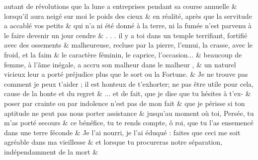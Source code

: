 \documentclass[12pt,onecolumn,twoside,a4paper]{memoir}
\begin{document}
\begin{pairs}
\begin{Rightside}
                       
                         \stanza 
                      autant de révolutions que la lune a entreprises pendant sa course
                              annuelle  \&
                         \stanza 
                      lorsqu’il aura neigé sur moi le poids des cieux \&
                         \stanza 
                      en réalité, après que la servitude a accablé vos petits  \&
                         \stanza 
                      qui n’a ni été donné à la terre, ni la fumée n’est parvenu à le faire
                              devenir un jour cendre \&
                         \stanza 
                      . . . il y a toi dans un temple terrifiant, fortifié avec des
                              ossements  \&
                         \stanza 
                      malheureuse, recluse par la pierre, l’ennui, la crasse, avec le
                              froid, et la faim \&
                         \stanza 
                      le caractère féminin, le caprice, l’occasion... \&
                         \stanza  beaucoup de femme, à l’âme inégale, a accru son malheur dans le
                              malheur , & 
                      un naturel vicieux leur a porté préjudice plus que le sort ou la
                              Fortune. \&
                         \stanza 
                      Je ne trouve pas comment je peux t’aider ; il est honteux de
                              t’exhorter; ne pas être utile 
                              pour cela, cause de la honte et du regret \&
                         \stanza  ... et de fait, que je dise que tu hésites à t’ex- & 
                     poser par crainte ou par indolence n’est pas de mon fait \&
                         \stanza 
                      que je périsse si ton aptitude ne peut pas nous porter assistance \&
                         \stanza 
                      jusqu’au moment où toi, Persée, tu m’as porté secours \&
                         \stanza 
                      ce bénéfice, tu te rends compte, ô roi, que tu l’as ensemencé dans
                              une terre féconde  \&
                         \stanza 
                      Je l’ai nourri, je l’ai éduqué : faites que ceci me soit agréable
                              dans ma vieillesse \&
                         \stanza 
                      et lorsque tu procureras notre séparation, indépendamment de la
                              mort \&
                     
                  \endnumbering
		\end{Rightside}
               \end{pairs}
	\Columns
            
\end{document}
